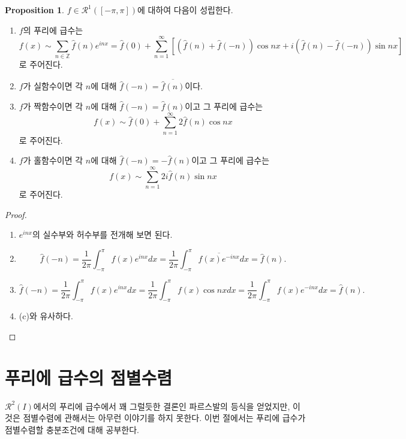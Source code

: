 \documentclass[11pt]{book}
\numberwithin{equation}{chapter}
\def\ZZ{\mathbb{Z}}
\def\calR{\mathcal{R}}
\theoremstyle{definition}
\newtheorem{prop}[thm]{Proposition}
\newenvironment{enum}
	{\begin{enumerate}[label=(\alph*), leftmargin=2\parindent]}
	{\end{enumerate}}
\begin{document}
\begin{prop}
    \(f \in \calR^1([-\pi, \pi])\)에 대하여 다음이 성립한다.
    \begin{enum}
        \item \(f\)의 푸리에 급수는
        \[
            f(x) \sim \sum_{n \in \ZZ} \hat{f}(n) e^{inx} = \hat{f}(0) + \sum_{n=1}^\infty [(\hat{f}(n) + \hat{f}(-n)) \cos nx + i(\hat{f}(n) - \hat{f}(-n)) \sin nx]
        \]
        로 주어진다.
        \item \(f\)가 실함수이면 각 \(n\)에 대해 \(\hat{f}(-n) = \overline{\hat{f}(n)}\)이다.
        \item \(f\)가 짝함수이면 각 \(n\)에 대해 \(\hat{f}(-n) = \hat{f}(n)\)이고 그 푸리에 급수는
        \[
            f(x) \sim \hat{f}(0) + \sum_{n=1}^\infty 2\hat{f}(n) \cos nx
        \]
        로 주어진다.
        \item \(f\)가 홀함수이면 각 \(n\)에 대해 \(\hat{f}(-n) = -\hat{f}(n)\)이고 그 푸리에 급수는
        \[
            f(x) \sim \sum_{n=1}^\infty 2i\hat{f}(n) \sin nx
        \]
        로 주어진다.
    \end{enum}
\end{prop}
\begin{proof}
    \quad

    \begin{enum}
        \item \(e^{inx}\)의 실수부와 허수부를 전개해 보면 된다.
        \item \[
            \hat{f}(-n) = \frac{1}{2\pi} \int_{-\pi}^\pi f(x) e^{inx} dx = \frac{1}{2\pi} \int_{-\pi}^\pi \overline{f(x) e^{-inx}}dx = \hat{f}(n).
        \]
        \item
        \[
            \hat{f}(-n) = \frac{1}{2\pi} \int_{-\pi}^\pi f(x) e^{inx} dx = \frac{1}{2\pi} \int_{-\pi}^\pi f(x) \cos nx dx = \frac{1}{2\pi} \int_{-\pi}^\pi f(x) e^{-inx} dx = \hat{f}(n).
        \]
        \item (c)와 유사하다.
    \end{enum}
\end{proof}

\section{푸리에 급수의 점별수렴}

\(\calR^2(I)\)에서의 푸리에 급수에서 꽤 그럴듯한 결론인 파르스발의 등식을 얻었지만, 이것은 점별수렴에 관해서는 아무런 이야기를 하지 못한다. 이번 절에서는 푸리에 급수가 점별수렴할 충분조건에 대해 공부한다. 
\end{document}
